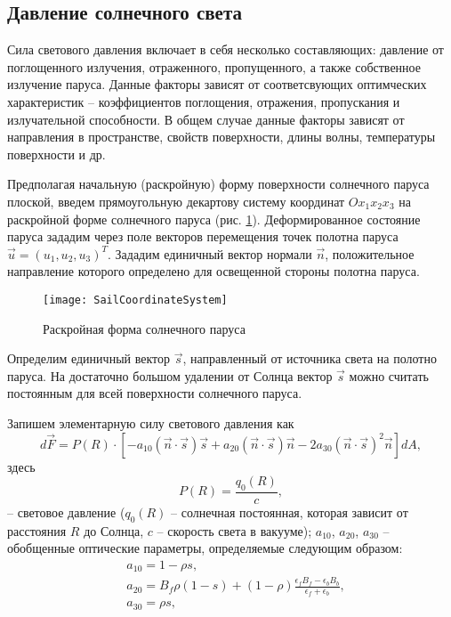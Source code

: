 \subsection{Давление солнечного света}
\noindent\indent Сила светового давления включает в себя несколько составляющих:
давление от поглощенного излучения, отраженного, пропущенного, а также собственное
излучение паруса. Данные факторы зависят от соответсвующих оптимческих характеристик --
коэффициентов поглощения, отражения, пропускания и излучательной способности. В
общем случае данные факторы зависят от направления в пространстве, свойств поверхности,
длины волны, температуры поверхности и др.\par
  Предполагая начальную (раскройную) форму поверхности солнечного паруса плоской,
введем прямоугольную декартову систему координат $Ox_1x_2x_3$ на раскройной форме
солнечного паруса (рис. \ref{fig:SailCoordinateSystem}). Деформированное состояние
паруса зададим через поле векторов перемещения точек полотна паруса
$\vec{u} = (u_1, u_2, u_3)^T$. Зададим единичный вектор нормали $\vec{n}$,
положительное направление которого определено для освещенной стороны полотна паруса.
\begin{figure}[h]
  \centering
  \texttt{[image: SailCoordinateSystem]}
  \caption{Раскройная форма солнечного паруса}
  \label{fig:SailCoordinateSystem}
\end{figure}
Определим единичный вектор $\vec{s}$, направленный от источника света на полотно
паруса. На достаточно большом удалении от Солнца вектор $\vec{s}$ можно считать
постоянным для всей поверхности солнечного паруса.\par
  Запишем элементарную силу светового давления как
\begin{equation}
  d\vec{F} = P(R) \cdot \left[
    -a_{10}(\vec{n}\cdot\vec{s})\vec{s}
    +a_{20}(\vec{n}\cdot\vec{s})\vec{n}
    -2a_{30}(\vec{n}\cdot\vec{s})^2\vec{n}
  \right]dA,
\end{equation}
здесь
\begin{equation}
  P(R) = \frac{q_0(R)}{c},
\end{equation}
-- световое давление ($q_0(R)$ -- солнечная постоянная, которая зависит от
расстояния $R$ до Солнца, $c$ -- скорость света в вакууме); $a_{10}$, $a_{20}$,
$a_{30}$ -- обобщенные оптические параметры, определяемые следующим образом:
\begin{equation}
  \begin{aligned}
    & a_{10} = 1 - \rho s, \\
    & a_{20} = B_f\rho(1 - s) + (1 - \rho)\frac{\epsilon_f B_f - \epsilon_b B_b}{\epsilon_f + \epsilon_b}, \\
    & a_{30} = \rho s, \\
  \end{aligned}
\end{equation}
